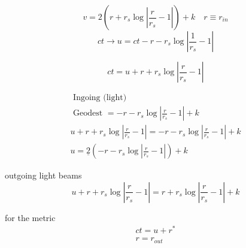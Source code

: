 $$
    v=2\left(r+r_s \log \left|\frac{r}{r_s}-1\right|\right)+k \quad r \equiv r_{i n}
$$
\begin{equation}
    c t \rightarrow u=c t-r-r_s \log \left|\frac{1}{r_s}-1\right|
\end{equation}

\begin{equation}
    c t=u+r+r_s \log \left|\frac{r}{r_s}-1\right|
\end{equation}


\begin{equation}
    \begin{array}{l}
        \text { Ingoing (light) }                                                            \\
        \text { Geodest }=-r-r_s \log \left|\frac{r}{r_s}-1\right|+k                         \\
        u+r+r_s \log \left|\frac{r}{r_s}-1\right|=-r-r_s \log \left|\frac{r}{r_s}-1\right|+k \\
        u=\underline{2}\left(-r-r_s \log \left|\frac{r}{r_s}-1\right|\right)+k
    \end{array}
\end{equation}

outgoing light beams
\begin{equation}
    u+r+r_s \log \left|\frac{r}{r_s}-1\right|=r+r_s \log \left|\frac{r}{r_s}-1\right|+k
\end{equation}


for the metric
\begin{equation}
    \begin{array}{l}
        c t=u+r^* \\
        r=r_{o u t}
    \end{array}
\end{equation}

